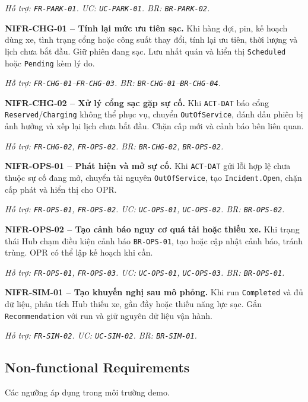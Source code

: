 \textit{Hỗ trợ: \texttt{FR-PARK-01}. UC: \texttt{UC-PARK-01}. BR: \texttt{BR-PARK-02}.}

\medskip
\noindent\textbf{NIFR-CHG-01 -- Tính lại mức ưu tiên sạc.} Khi hàng đợi, pin, kế hoạch dùng xe, tình trạng cổng hoặc công suất thay đổi, tính lại ưu tiên, thời lượng và lịch chưa bắt đầu. Giữ phiên đang sạc. Lưu nhất quán và hiển thị \texttt{Scheduled} hoặc \texttt{Pending} kèm lý do.

\textit{Hỗ trợ: \texttt{FR-CHG-01}--\texttt{FR-CHG-03}. BR: \texttt{BR-CHG-01}--\texttt{BR-CHG-04}.}

\medskip
\noindent\textbf{NIFR-CHG-02 -- Xử lý cổng sạc gặp sự cố.} Khi \texttt{ACT-DAT} báo cổng \texttt{Reserved}/\texttt{Charging} không thể phục vụ, chuyển \texttt{OutOfService}, đánh dấu phiên bị ảnh hưởng và xếp lại lịch chưa bắt đầu. Chặn cấp mới và cảnh báo bên liên quan.

\textit{Hỗ trợ: \texttt{FR-CHG-02}, \texttt{FR-OPS-02}. BR: \texttt{BR-CHG-02}, \texttt{BR-OPS-02}.}

\medskip
\noindent\textbf{NIFR-OPS-01 -- Phát hiện và mở sự cố.} Khi \texttt{ACT-DAT} gửi lỗi hợp lệ chưa thuộc sự cố đang mở, chuyển tài nguyên \texttt{OutOfService}, tạo \texttt{Incident.Open}, chặn cấp phát và hiển thị cho OPR.

\textit{Hỗ trợ: \texttt{FR-OPS-01}, \texttt{FR-OPS-02}. UC: \texttt{UC-OPS-01}, \texttt{UC-OPS-02}. BR: \texttt{BR-OPS-02}.}

\medskip
\noindent\textbf{NIFR-OPS-02 -- Tạo cảnh báo nguy cơ quá tải hoặc thiếu xe.} Khi trạng thái Hub chạm điều kiện cảnh báo \texttt{BR-OPS-01}, tạo hoặc cập nhật cảnh báo, tránh trùng. OPR có thể lập kế hoạch khi cần.

\textit{Hỗ trợ: \texttt{FR-OPS-01}, \texttt{FR-OPS-03}. UC: \texttt{UC-OPS-01}, \texttt{UC-OPS-03}. BR: \texttt{BR-OPS-01}.}

\medskip
\noindent\textbf{NIFR-SIM-01 -- Tạo khuyến nghị sau mô phỏng.} Khi run \texttt{Completed} và đủ dữ liệu, phân tích Hub thiếu xe, gần đầy hoặc thiếu năng lực sạc. Gắn \texttt{Recommendation} với run và giữ nguyên dữ liệu vận hành.

\textit{Hỗ trợ: \texttt{FR-SIM-02}. UC: \texttt{UC-SIM-02}. BR: \texttt{BR-SIM-01}.}

\subsection{Non-functional Requirements}

Các ngưỡng áp dụng trong môi trường demo.

